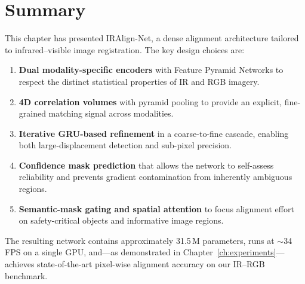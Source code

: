 \section{Summary}
\label{sec:arch_summary}

This chapter has presented IRAlign-Net, a dense alignment architecture
tailored to infrared--visible image registration.  The key design choices
are:
\begin{enumerate}
  \item \textbf{Dual modality-specific encoders} with Feature Pyramid
        Networks to respect the distinct statistical properties of IR and
        RGB imagery.
  \item \textbf{4D correlation volumes} with pyramid pooling to provide
        an explicit, fine-grained matching signal across modalities.
  \item \textbf{Iterative GRU-based refinement} in a coarse-to-fine
        cascade, enabling both large-displacement detection and sub-pixel
        precision.
  \item \textbf{Confidence mask prediction} that allows the network to
        self-assess reliability and prevents gradient contamination from
        inherently ambiguous regions.
  \item \textbf{Semantic-mask gating and spatial attention} to focus
        alignment effort on safety-critical objects and informative
        image regions.
\end{enumerate}

\noindent
The resulting network contains approximately 31.5\,M parameters, runs at
$\sim$34\,FPS on a single GPU, and---as demonstrated in
Chapter~\ref{ch:experiments}---achieves state-of-the-art pixel-wise
alignment accuracy on our IR--RGB benchmark.
